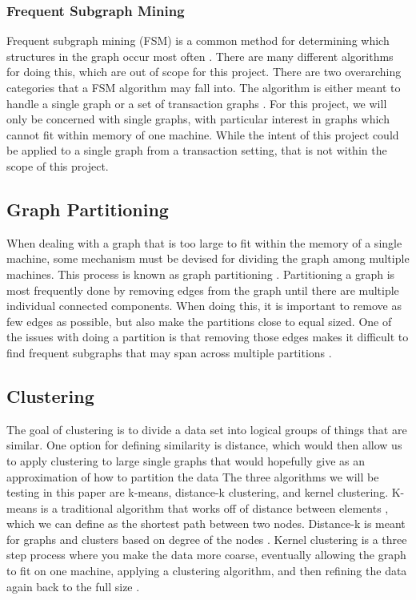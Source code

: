 \documentclass[12pt]{article}
\begin{document}
\subsubsection{Frequent Subgraph Mining}
Frequent subgraph mining (FSM) is a common method for determining which structures in the graph occur most often \cite{survey}. There are many different algorithms for doing this, which are out of scope for this project.
\newline\newline
There are two overarching categories that a FSM algorithm may fall into. The algorithm is either meant to handle a single graph or a set of transaction graphs \cite{survey}. For this project, we will only be concerned with single graphs, with particular interest in graphs which cannot fit within memory of one machine. While the intent of this project could be applied to a single graph from a transaction setting, that is not within the scope of this project.

\subsection{Graph Partitioning}
When dealing with a graph that is too large to fit within the memory of a single machine, some mechanism must be devised for dividing the graph among multiple machines. This process is known as graph partitioning \cite{partition}.
\newline\newline
Partitioning a graph is most frequently done by removing edges from the graph until there are multiple individual connected components. When doing this, it is important to remove as few edges as possible, but also make the partitions close to equal sized. One of the issues with doing a partition is that removing those edges makes it difficult to find frequent subgraphs that may span across multiple partitions \cite{partition}.

\subsection{Clustering}
The goal of clustering is to divide a data set into logical groups of things that are similar. One option for defining similarity is distance, which would then allow us to apply clustering to large single graphs that would hopefully give as an approximation of how to partition the data
\newline\newline
The three algorithms we will be testing in this paper are k-means, distance-k clustering, and kernel clustering. K-means is a traditional algorithm that works off of distance between elements \cite{kmeans}, which we can define as the shortest path between two nodes. Distance-k is meant for graphs and clusters based on degree of the nodes \cite{distK}. Kernel clustering is a three step process where you make the data more coarse, eventually allowing the graph to fit on one machine, applying a clustering algorithm, and then refining the data again back to the full size \cite{kernel}.
\end{document}
